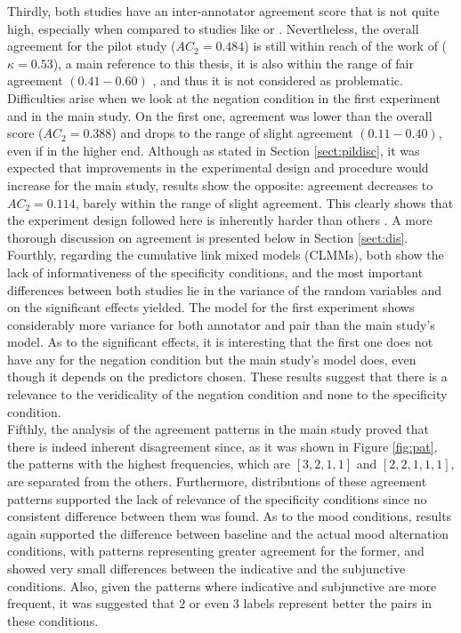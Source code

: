 Thirdly, both studies have an inter-annotator agreement score that is not quite high, especially when compared to studies like \citet{sauri2009factbank} or \citet{ross2019well}. Nevertheless, the overall agreement for the pilot study ($AC_2=0.484$) is still within reach of the work of \citet{de2012did} ($\kappa = 0.53$), a main reference to this thesis, it is also within the range of fair agreement $(0.41-0.60)$ \citep{shrout1998measurement}, and thus it is not considered as problematic. Difficulties arise when we look at the negation condition in the first experiment and in the main study. On the first one, agreement was lower than the overall score ($AC_2=0.388$) and drops to the range of slight agreement $(0.11-0.40)$, even if in the higher end. Although as stated in Section \ref{sect:pildisc}, it was expected that improvements in the experimental design and procedure would increase for the main study, results show the opposite: agreement decreases to $AC_2=0.114$, barely within the range of slight agreement. This clearly shows that the experiment design followed here is inherently harder than others \citep{pavlick2019inherent}. A more thorough discussion on agreement is presented below in Section \ref{sect:dis}.\\

Fourthly, regarding the cumulative link mixed models (CLMMs), both show the lack of informativeness of the specificity conditions, and the most important differences between both studies lie in the variance of the random variables and on the significant effects yielded. The model for the first experiment shows considerably more variance for both annotator and pair than the main study's model. As to the significant effects, it is interesting that the first one does not have any for the negation condition but the main study's model does, even though it depends on the predictors chosen. These results suggest that there is a relevance to the veridicality of the negation condition and none to the specificity condition.\\

Fifthly, the analysis of the agreement patterns in the main study proved that there is indeed inherent disagreement since, as it was shown in Figure \ref{fig:pat}, the patterns with the highest frequencies, which are $[3,2,1,1]$ and $[2,2,1,1,1]$, are separated from the others. Furthermore, distributions of these agreement patterns supported the lack of relevance of the specificity conditions since no consistent difference between them was found. As to the mood conditions, results again supported the difference between baseline and the actual mood alternation conditions, with patterns representing greater agreement for the former, and showed very small differences between the indicative and the subjunctive conditions. Also, given the patterns where indicative and subjunctive are more frequent, it was suggested that $2$ or even $3$ labels represent better the pairs in these conditions.\\

